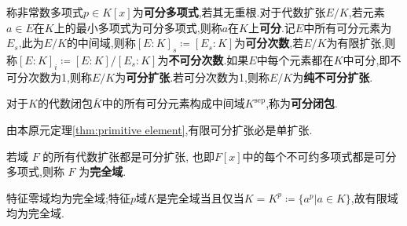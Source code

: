 \begin{definition}
	称非常数多项式$p\in K[x]$为\textbf{可分多项式},若其无重根.对于代数扩张$E/K$,若元素$a\in E$在$K$上的最小多项式为可分多项式,则称$a$在$K$上\textbf{可分}.记$E$中所有可分元素为$E_s$,此为$E/K$的中间域,则称$[E:K]_s\coloneqq[E_s:K]$为\textbf{可分次数},若$E/K$为有限扩张,则称$[E:K]_i\coloneqq[E:K]/[E_s:K]$为\textbf{不可分次数}.如果$E$中每个元素都在$K$中可分,即不可分次数为1,则称$E/K$为\textbf{可分扩张}.若可分次数为1,则称$E/K$为\textbf{纯不可分扩张}.
\end{definition}
\begin{definition}
	对于$K$的代数闭包$\overline{K}$中的所有可分元素构成中间域$K^{\text{sep}}$,称为\textbf{可分闭包}.
\end{definition}
\begin{corollary}
	由本原元定理\ref{thm:primitive element},有限可分扩张必是单扩张.
\end{corollary}
\begin{definition}\label{def:perfect-field}
	若域 $F$ 的所有代数扩张都是可分扩张, 也即$F[x]$中的每个不可约多项式都是可分多项式,则称 $F$ 为\textbf{完全域}.
\end{definition}
\begin{example}
	特征零域均为完全域;特征$p$域$K$是完全域当且仅当$K=K^p\coloneqq \{a^p|a\in K\}$,故有限域均为完全域.
\end{example}

